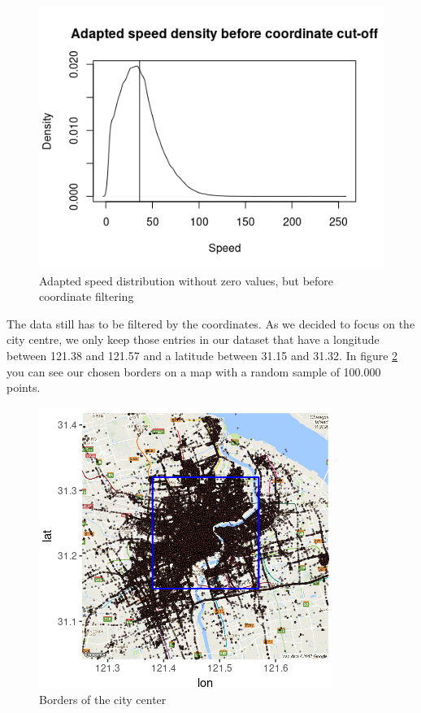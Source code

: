 \documentclass[11pt,conference,a4paper,twocolumns,romanappendices]{IEEEtran}
\begin{document}
\begin{figure}[h]
\centering
\includegraphics[scale=0.6]{density_before.png}
\caption{\label{fig:speed_before}Adapted speed distribution without zero values, but before coordinate filtering}
\end{figure}

The data still has to be filtered by the coordinates. As we decided to focus on the city centre, we only keep those entries in our dataset that have a longitude between 121.38 and 121.57 and a latitude between 31.15 and 31.32. In figure \ref{fig:borders} you can see our chosen borders on a map with a random sample of 100.000 points. \\

\begin{figure}[h]
\centering
\includegraphics[scale=0.9]{borders.png}
\caption{\label{fig:borders}Borders of the city center}
\end{figure}
\end{document}
